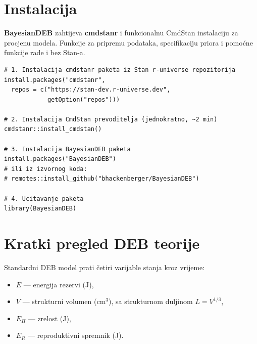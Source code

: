 \documentclass[11pt,a4paper]{article}
\newcommand{\pkg}[1]{\textbf{#1}}
\newcommand{\Stan}{\textsf{Stan}}
\begin{document}
\section{Instalacija}
\label{sec:instalacija}

\pkg{BayesianDEB} zahtijeva \pkg{cmdstanr} i funkcionalnu CmdStan
instalaciju za procjenu modela.  Funkcije za pripremu podataka,
specifikaciju priora i pomoćne funkcije rade i bez \Stan{}-a.

\begin{lstlisting}
# 1. Instalacija cmdstanr paketa iz Stan r-universe repozitorija
install.packages("cmdstanr",
  repos = c("https://stan-dev.r-universe.dev",
            getOption("repos")))

# 2. Instalacija CmdStan prevoditelja (jednokratno, ~2 min)
cmdstanr::install_cmdstan()

# 3. Instalacija BayesianDEB paketa
install.packages("BayesianDEB")
# ili iz izvornog koda:
# remotes::install_github("bhackenberger/BayesianDEB")

# 4. Ucitavanje paketa
library(BayesianDEB)
\end{lstlisting}


\section{Kratki pregled DEB teorije}
\label{sec:deb-teorija}

Standardni DEB model prati četiri varijable stanja kroz vrijeme:
\begin{itemize}[nosep]
  \item $E$ --- energija rezervi (J),
  \item $V$ --- strukturni volumen (cm$^3$), sa strukturnom duljinom $L = V^{1/3}$,
  \item $E_H$ --- zrelost (J),
  \item $E_R$ --- reproduktivni spremnik (J).
\end{itemize}
\end{document}
